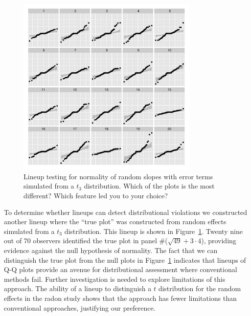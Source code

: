 \documentclass[12pt]{article}
\begin{document}
\begin{figure}
	\centering
	\includegraphics[width=0.8\textwidth]{radontranef-19.pdf}
	\caption{\label{fig:qqlineup-t} Lineup  testing for normality of random slopes with error terms simulated from a $t_3$ distribution. Which of the plots is the most different? Which feature led you to your choice?}
\end{figure}


To determine whether lineups can detect distributional violations we constructed another lineup where the ``true plot'' was constructed from random effects simulated from a $t_3$ distribution. This lineup is shown in Figure~\ref{fig:qqlineup-t}. Twenty nine out of 70 observers identified the true plot in panel \#($\sqrt{49} + 3\cdot4$), providing evidence against the null hypothesis of normality.  
 The fact that we can distinguish the true plot from the null plots in Figure~\ref{fig:qqlineup-t} indicates that lineups of Q-Q plots provide an avenue for distributional assessment where conventional methods fail. Further investigation is needed to explore limitations of this approach. %
 The ability of a lineup to distinguish a $t$ distribution for the random effects in the radon study shows that the approach has fewer limitations than conventional approaches, justifying our preference.
\end{document}
